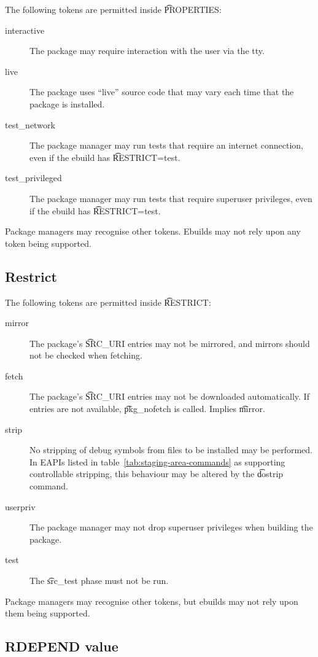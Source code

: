 The following tokens are permitted inside \t{PROPERTIES}:
\nobreakpar
\begin{description}
\item[interactive] The package may require interaction with the user via the tty.
\item[live] The package uses ``live'' source code that may vary each time that the package is
    installed.
\item[test_network] The package manager may run tests that require an internet connection, even if
    the ebuild has \t{RESTRICT=test}.
\item[test_privileged] The package manager may run tests that require superuser privileges, even
    if the ebuild has \t{RESTRICT=test}.
\end{description}

Package managers may recognise other tokens. Ebuilds may not rely upon any token being supported.

\subsection{Restrict}
\label{sec:restrict}

The following tokens are permitted inside \t{RESTRICT}:
\nobreakpar
\begin{description}
\item[mirror] The package's \t{SRC_URI} entries may not be mirrored, and mirrors should not be
    checked when fetching.
\item[fetch] The package's \t{SRC_URI} entries may not be downloaded automatically. If entries are
    not available, \t{pkg_nofetch} is called. Implies \t{mirror}.
\item[strip] No stripping of debug symbols from files to be installed may be performed. In EAPIs
    listed in table~\ref{tab:staging-area-commands} as supporting controllable stripping, this
    behaviour may be altered by the \t{dostrip} command.
\item[userpriv] The package manager may not drop superuser privileges when building the package.
\item[test] The \t{src_test} phase must not be run.
\end{description}

Package managers may recognise other tokens, but ebuilds may not rely upon them being supported.

\subsection{RDEPEND value}
\label{sec:rdepend-depend}

